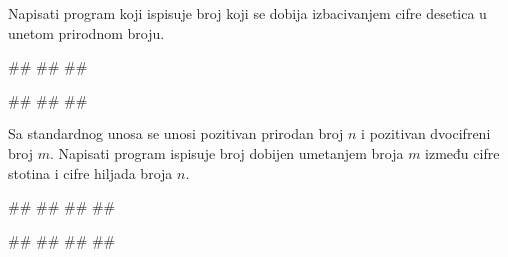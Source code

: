 \begin{Exercise}[label=p1.1_08] 
Napisati program koji ispisuje broj koji se dobija izbacivanjem cifre desetica u unetom prirodnom broju.

\begin{miditest}
\begin{upotreba}{1}
#\naslovInt#
##
##
\end{upotreba}
\end{miditest}
\begin{miditest}
\begin{upotreba}{2}
#\naslovInt#
##
##
\end{upotreba}
\end{miditest}

\end{Exercise}


\begin{Exercise}[label=p1_16]
Sa standardnog unosa se unosi pozitivan prirodan broj $n$ i pozitivan dvocifreni broj $m$. Napisati program ispisuje broj dobijen umetanjem broja $m$ između cifre stotina i cifre hiljada broja $n$. 

\begin{miditest}
\begin{upotreba}{1}
#\naslovInt#
##
##
##
\end{upotreba}
\end{miditest}  
\begin{miditest}
\begin{upotreba}{2}
#\naslovInt#
##
##
##
\end{upotreba}
\end{miditest}   

\end{Exercise}
\ifresenja
\begin{Answer}[ref=p1_16]
\end{Answer}
\fi



